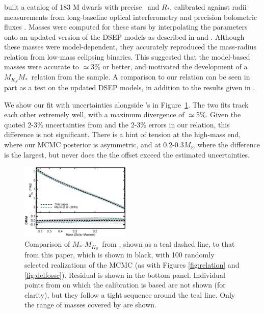 \documentclass[twocolumn]{aastex62}
\newcommand{\mks}{$M_{K_S}$}
\newcommand{\mmk}{$M_{K_S}$\textendash$M_*$}
\begin{document}
\subsubsection{\citet{Mann2015b}}

\citet{Mann2015b} built a catalog of 183 M dwarfs with precise \teff\ and $R_*$, calibrated against radii measurements from long-baseline optical interferometry \citep{Boyajian2012} and precision bolometric fluxes \citep[e.g.,][]{Mann2015a,2015MNRAS.447..846B}. Masses were computed for these stars by interpolating the parameters onto an updated version of the DSEP models as described in \citet{Feiden2013,Feiden2014} and \citet{Muirhead2014}. Although these masses were model-dependent, they accurately reproduced the mass-radius relation from low-mass eclipsing binaries. This suggested that the model-based masses were accurate to $\simeq$3\% or better, and motivated the development of a \mmk\ relation from the \citet{Mann2015b} sample. A comparison to our relation can be seen in part as a test on the updated DSEP models, in addition to the results given in \citet{Mann2015b}. 

We show our fit with uncertainties alongside \citet{Mann2015b}'s in Figure~\ref{fig:mann}. The two fits track each other extremely well, with a maximum divergence of $\simeq$5\%. Given the quoted 2-3\% uncertainties from \citet{Mann2015b} and the 2-3\% errors in our relation, this difference is not significant. There is a hint of tension at the high-mass end, where our MCMC posterior is asymmetric, and at 0.2-0.3$M_\odot$ where the difference is the largest, but never does the the offset exceed the estimated uncertainties. 

\begin{figure}[htb]
\begin{center}
\includegraphics[width=0.47\textwidth]{Mann_comp.eps}
\caption{Comparison of $M_*$-\mks\ from \citet{Mann2015b}, shown as a teal dashed line, to that from this paper, which is shown in black, with 100 randomly selected realizations of the MCMC (as with Figures \ref{fig:relation} and \ref{fig:delfosse}). Residual is shown in the bottom panel. Individual points from \citet{Mann2015b} on which the calibration is based are not shown (for clarity), but they follow a tight sequence around the teal line. Only the range of masses covered by \citet{Mann2015b} are shown. }
\label{fig:mann}
\end{center}
\end{figure}
\end{document}

